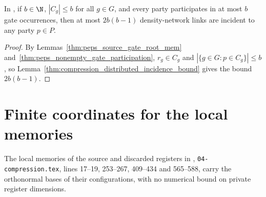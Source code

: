 \begin{lemma}
    \label{thm:peps_actual_density_link_incidence}
    \leanok
    In \cite[proof of Theorem~5.2]{OpenAI2026PolynomialPEPS}, if $b\in\N$,
    $|C_g|\le b$ for all $g\in G$, and every party participates in at most $b$
    gate occurrences, then at most $2b(b-1)$ density-network links are incident
    to any party $p\in P$.
\end{lemma}

\begin{proof}
    \leanok
    By Lemmas~\ref{thm:peps_source_gate_root_mem}
    and~\ref{thm:peps_nonempty_gate_participation}, $r_g\in C_g$ and
    $|\{g\in G:p\in C_g\}|\le b$, so
    Lemma~\ref{thm:compression_distributed_incidence_bound} gives the bound
    $2b(b-1)$.
\end{proof}

\section{Finite coordinates for the local memories}

The local memories of the source and discarded registers in
\cite[proof of Theorem~5.2]{OpenAI2026PolynomialPEPS},
\texttt{04-compression.tex}, lines 17--19, 253--267, 409--434 and 565--588,
carry the orthonormal bases of their configurations, with no numerical bound
on private register dimensions.

